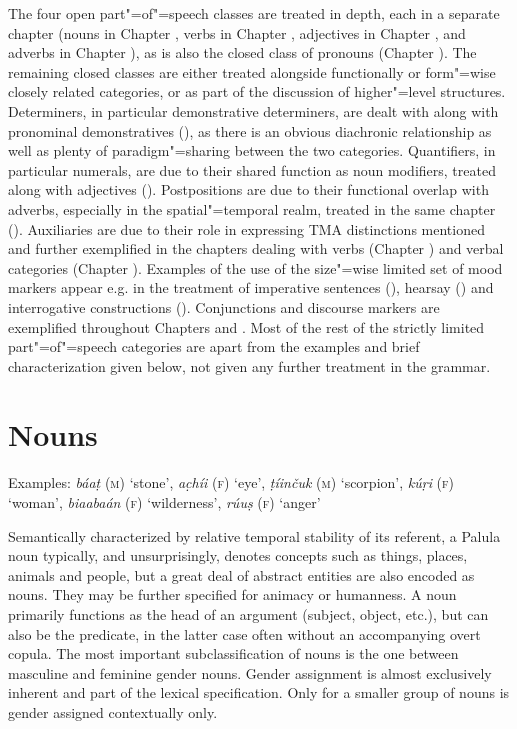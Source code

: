 The four open part"=of"=speech classes are treated in depth, each in a separate chapter (nouns in Chapter , verbs in Chapter , adjectives in Chapter , and adverbs in Chapter ), as is also the closed class of pronouns (Chapter ). The remaining closed classes are either treated alongside functionally or form"=wise closely related categories, or as part of the discussion of higher"=level structures. Determiners, in particular demonstrative determiners, are dealt with along with pronominal demonstratives (), as there is an obvious diachronic relationship as well as plenty of paradigm"=sharing between the two categories. Quantifiers, in particular numerals, are due to their shared function as noun modifiers, treated along with adjectives (). Postpositions are due to their functional overlap with adverbs, especially in the spatial"=temporal realm, treated in the same chapter (). Auxiliaries are due to their role in expressing TMA distinctions mentioned and further exemplified in the chapters dealing with verbs (Chapter ) and verbal categories (Chapter ). Examples of the use of the size"=wise limited set of mood markers appear e.g. in the treatment of imperative sentences (), hearsay () and interrogative constructions (). Conjunctions and discourse markers are exemplified throughout Chapters  and . Most of the rest of the strictly limited part"=of"=speech categories are apart from the examples and brief characterization given below, not given any further treatment in the grammar.


\section{Nouns}
\label{sec:3b-2}

Examples: \textit{báaṭ} (\textsc{m}) `stone', \textit{ac̣híi} (\textsc{f}) `eye', \textit{ṭíinčuk} (\textsc{m}) `scorpion', \textit{kúṛi} (\textsc{f}) `woman',  \textit{biaabaán} (\textsc{f}) `wilderness', \textit{rúuṣ} (\textsc{f}) `anger'


Semantically characterized by relative temporal stability of its referent, a Palula noun typically, and unsurprisingly, denotes concepts such as things, places, animals and people, but a great deal of abstract entities are also encoded as nouns. They may be further specified for animacy or humanness. A noun primarily functions as the head of an argument (subject, object, etc.), but can also be the predicate, in the latter case often without an accompanying overt copula. The most important subclassification of nouns is the one between masculine and feminine gender nouns. Gender assignment is almost exclusively inherent and part of the lexical specification. Only for a smaller group of nouns is gender assigned contextually only.


